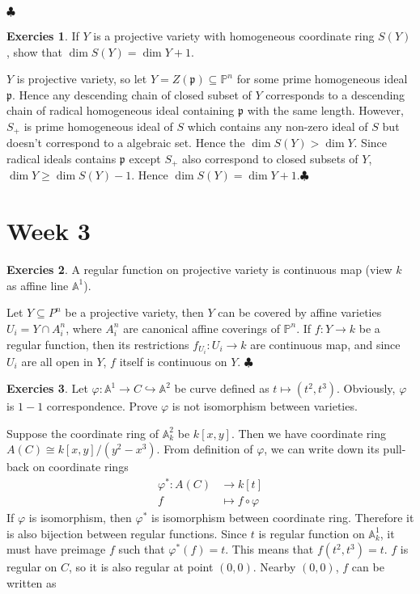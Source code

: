 \documentclass[12pt,a4paper]{article}
\theoremstyle{definition}
\newtheorem{exer}{Exercies}[subsection]
\newcommand*{\qeds}{\hfill\ensuremath{\clubsuit}}
\begin{document}
\qeds
\begin{exer}
	If $Y$ is a projective variety with homogeneous coordinate ring $S(Y)$, show that $\dim S(Y) = \dim Y +1$.
\end{exer}
$Y$ is projective variety, so let $Y= Z(\mathfrak{p}) \subseteq \mathbb{P}^n$ for some prime homogeneous ideal $\mathfrak{p}$. Hence any descending chain of closed subset of $Y$ corresponds to a descending chain of radical homogeneous ideal containing $\mathfrak{p}$ with the same length. However, $S_+$ is prime homogeneous ideal of $S$ which contains any non-zero ideal of $S$ but doesn't correspond to a algebraic set. Hence the $\dim S(Y) > \dim Y$. Since radical ideals contains $\mathfrak{p}$ except $S_+$ also correspond to closed subsets of $Y$, $\dim Y  \geq \dim S(Y)-1$. Hence $\dim S(Y) = \dim Y +1$.\qeds
\section{Week 3}
\begin{exer}
	A regular function on projective variety is continuous map (view $k$ as affine line $\mathbb{A}^1$).
\end{exer}
Let $Y \subseteq P^n$ be a projective variety, then $Y$ can be covered by affine varieties $U_i=Y \cap A^n_i$, where $A^n_i$ are canonical affine coverings of $\mathbb{P}^n$. If $f\colon Y \to k$ be a regular function, then its restrictions $f_{U_i} \colon U_i \to k$ are continuous map, and since $U_i$ are all open in $Y$, $f$ itself is continuous on $Y$. \qeds
\begin{exer}
	Let $\varphi: \mathbb{A}^1 \to C \hookrightarrow \mathbb{A}^2$ be curve defined as $ t \mapsto (t^2,t^3)$. Obviously, $\varphi$ is $1-1$ correspondence. Prove $\varphi$ is not isomorphism between varieties.
\end{exer}
Suppose the coordinate ring of $\mathbb{A}^2_k$ be $k[x,y]$. Then we have coordinate ring $A(C) \cong k[x,y]/(y^2-x^3)$. From definition of $\varphi$, we can write down its pull-back on coordinate rings
\[
\begin{aligned}
\varphi^* \colon A(C) &\to k[t]\\
f& \mapsto f \circ \varphi
\end{aligned}
\]
If $\varphi$ is isomorphism, then $\varphi^*$ is isomorphism between coordinate ring. Therefore it is also bijection between regular functions. Since $t$ is regular function on $\mathbb{A}^1_k$, it must have preimage $f$ such that $\varphi^*(f)=t$. This means that $f(t^2,t^3)=t$. $f$ is regular on $C$, so it is also regular at point $(0,0)$. Nearby $(0,0)$, $f$ can be written as
\end{document}
